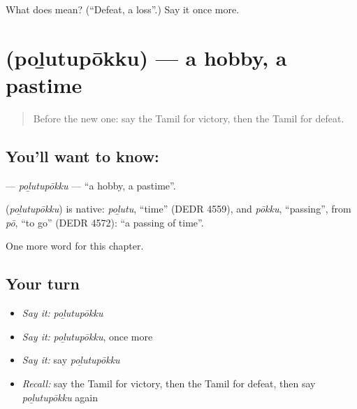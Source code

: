\begin{tcolorbox}[breakable,colback=teal!4,colframe=teal!35!black,title={Before you move on}]
What does  mean? (\textquotedblleft{}Defeat, a loss\textquotedblright{}.) Say it once more.
\end{tcolorbox}
\section[\texorpdfstring{\ta{பொழுதுபோக்கு} (poḻutupōkku)}{பொழுதுபோக்கு (poḻutupōkku)}]{ (poḻutupōkku) — a hobby, a pastime}

\label{lesson:TA-C277-polutupokku}



\begin{quote}
Before the new one: say the Tamil for victory, then the Tamil for defeat.
\end{quote}

\subsection*{You'll want to know: }
\textbf{} — \emph{poḻutupōkku} — \textquotedblleft{}a hobby, a pastime\textquotedblright{}.

\begin{cousinweb}
\textbf{} (\emph{poḻutupōkku}) is native: \emph{poḻutu}, \textquotedblleft{}time\textquotedblright{} (DEDR 4559), and \emph{pōkku}, \textquotedblleft{}passing\textquotedblright{}, from \emph{pō}, \textquotedblleft{}to go\textquotedblright{} (DEDR 4572): \textquotedblleft{}a passing of time\textquotedblright{}.
\end{cousinweb}

\begin{grammarlens}[title={What you've built}]
One more word for this chapter.
\end{grammarlens}

\subsection*{Your turn}
\begin{itemize}
\raggedright
  \item \emph{Say it:} \emph{poḻutupōkku}
  \item \emph{Say it:} \emph{poḻutupōkku}, once more
  \item \emph{Say it:} say \emph{poḻutupōkku}
  \item \emph{Recall:} say the Tamil for victory, then the Tamil for defeat, then say \emph{poḻutupōkku} again
\end{itemize}

